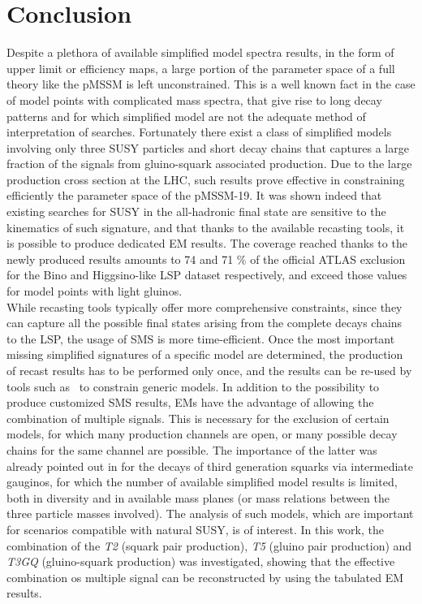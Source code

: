 \documentclass[epj,nopacs,fleqn]{svjour}
\begin{document}
\section{Conclusion}\label{sec:conclusion}
Despite a plethora of available simplified model spectra results, in the form of upper limit or efficiency maps, a large portion of the parameter space of a full theory like the pMSSM is left unconstrained. This is a well known fact in the case of model points with complicated mass spectra, that give rise to long decay patterns and for which simplified model are not the adequate method of interpretation of searches. Fortunately there exist a class of simplified models involving only three SUSY particles and short decay chains that captures a large fraction of the signals from gluino-squark associated production. Due to the large production cross section at the LHC, such results prove effective in constraining efficiently the parameter space of the pMSSM-19. It was shown indeed that existing searches for SUSY in the all-hadronic final state are sensitive to the kinematics of such signature, and that thanks to the available recasting tools, it is possible to produce dedicated EM results. The coverage reached thanks to the newly produced results amounts to 74 and 71 $\%$ of the official ATLAS exclusion for the Bino and Higgsino-like LSP dataset respectively, and exceed those values for model points with light gluinos. 
\\
While recasting tools typically offer more comprehensive constraints, since they can capture all the possible final states arising from the complete decays chains to the LSP, the usage of SMS is more time-efficient. Once the most important missing simplified signatures of a specific model are determined, the production of recast results has to be performed only once, and the results can be re-used by tools such as \SMO~to constrain generic models.
In addition to the possibility to produce customized SMS results, EMs have the advantage of allowing the combination of multiple signals. This is necessary for the exclusion of certain models, for which many production channels are open, or many possible decay chains for the same channel are possible. The importance of the latter was already pointed out in \cite{Ambrogi:2017lov} for the decays of third generation squarks via intermediate gauginos, for which the number of available simplified model results is limited, both in diversity and in available mass planes (or mass relations between the three particle masses involved).  The analysis of such models, which are important for scenarios compatible with natural SUSY, is of interest. In this work, the combination of the \textit{T2} (squark pair production), \textit{T5} (gluino pair production) and \textit{T3GQ} (gluino-squark production) was investigated, showing that the effective combination os multiple signal can be reconstructed by using the tabulated EM results.
\end{document}

